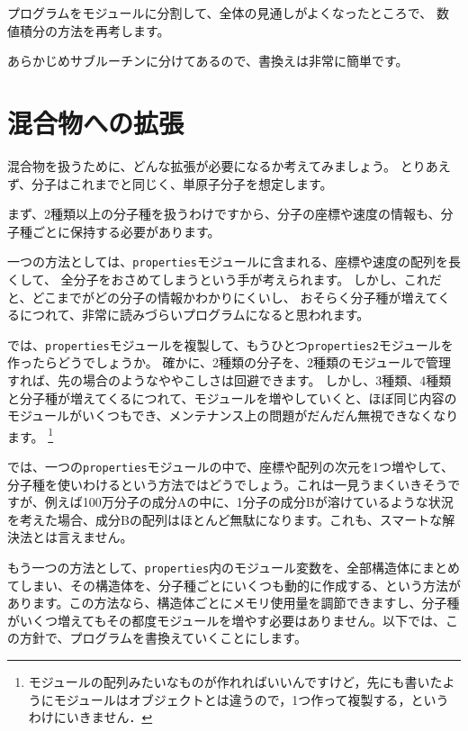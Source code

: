 \documentclass[a4,10pt]{article}
\begin{document}
プログラムをモジュールに分割して、全体の見通しがよくなったところで、
数値積分の方法を再考します。

あらかじめサブルーチンに分けてあるので、書換えは非常に簡単です。



\section{混合物への拡張}

混合物を扱うために、どんな拡張が必要になるか考えてみましょう。
とりあえず、分子はこれまでと同じく、単原子分子を想定します。

まず、2種類以上の分子種を扱うわけですから、分子の座標や速度の情報も、分子種ごとに保持する必要があります。

一つの方法としては、{\tt properties}モジュールに含まれる、座標や速度の配列を長くして、
全分子をおさめてしまうという手が考えられます。
しかし、これだと、どこまでがどの分子の情報かわかりにくいし、
おそらく分子種が増えてくるにつれて、非常に読みづらいプログラムになると思われます。

では、{\tt properties}モジュールを複製して、もうひとつ{\tt properties2}モジュールを作ったらどうでしょうか。
確かに、2種類の分子を、2種類のモジュールで管理すれば、先の場合のようなややこしさは回避できます。
しかし、3種類、4種類と分子種が増えてくるにつれて、モジュールを増やしていくと、ほぼ同じ内容の
モジュールがいくつもでき、メンテナンス上の問題がだんだん無視できなくなります。
\footnote{モジュールの配列みたいなものが作れればいいんですけど，先にも書いたようにモジュールはオブジェクトとは違うので，1つ作って複製する，というわけにいきません．}

では、一つの{\tt properties}モジュールの中で、座標や配列の次元を1つ増やして、分子種を使いわけるという方法ではどうでしょう。これは一見うまくいきそうですが、例えば100万分子の成分Aの中に、1分子の成分Bが溶けているような状況を考えた場合、成分Bの配列はほとんど無駄になります。これも、スマートな解決法とは言えません。

もう一つの方法として、{\tt properties}内のモジュール変数を、全部構造体にまとめてしまい、その構造体を、分子種ごとにいくつも動的に作成する、という方法があります。この方法なら、構造体ごとにメモリ使用量を調節できますし、分子種がいくつ増えてもその都度モジュールを増やす必要はありません。以下では、この方針で、プログラムを書換えていくことにします。

\end{document}

